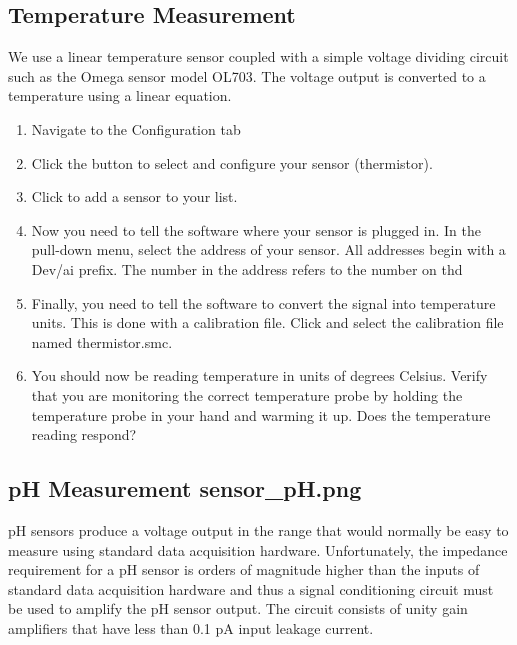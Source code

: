 \documentclass[letterpaper,10pt,english]{sphinxmanual}
\begin{document}
\subsection{Temperature Measurement}
\label{\detokenize{ProCoDA/ProCoDA:temperature-measurement}}\label{\detokenize{ProCoDA/ProCoDA:heading-procoda-temperature-measurement}}
We use a linear temperature sensor coupled with a simple voltage dividing circuit such as the Omega sensor model OL703. The voltage output is converted to a temperature using a linear equation.
\begin{enumerate}
\item {} 
Navigate to the Configuration tab

\item {} 
Click the  button to select and configure your sensor (thermistor).

\item {} 
Click  to add a sensor to your list.

\item {} 
Now you need to tell the software where your sensor is plugged in.  In the  pull-down menu, select the address of your sensor.  All addresses begin with a Dev/ai prefix. The number in the address refers to the number on thd

\item {} 
Finally, you need to tell the software to convert the signal into temperature units.  This is done with a calibration file.  Click  and select the calibration file named thermistor.smc.

\item {} 
You should now be reading temperature in units of degrees Celsius. Verify that you are monitoring the correct temperature probe by holding the temperature probe in your hand and warming it up.  Does the temperature reading respond?

\end{enumerate}


\subsection[pH Measurement]{pH Measurement \lowercase{\sphinxincludegraphics}{{sensor_pH}.png}}
\label{\detokenize{ProCoDA/ProCoDA:ph-measurement-sensor-ph}}\label{\detokenize{ProCoDA/ProCoDA:heading-procoda-ph-measurement}}
pH sensors produce a voltage output in the range that would normally be easy to measure using standard data acquisition hardware. Unfortunately, the impedance requirement for a pH sensor is orders of magnitude higher than the inputs of standard data acquisition hardware and thus a signal conditioning circuit must be used to amplify the pH sensor output. The circuit consists of unity gain amplifiers that have less than 0.1 pA input leakage current.
\end{document}
